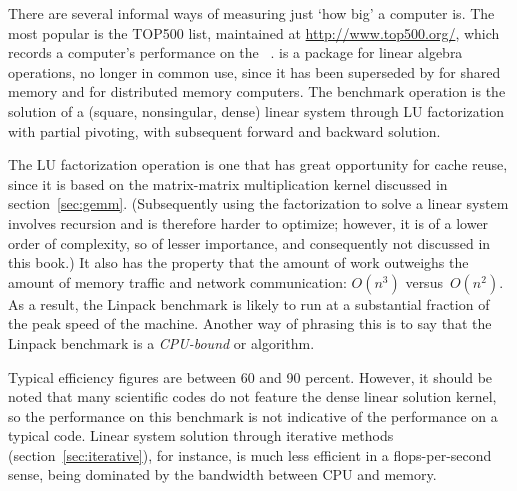 

There are several informal ways of measuring just `how big' a computer
is.
The most popular is the TOP500 list, maintained at
\url{http://www.top500.org/}, which records a computer's performance
on the 
~\cite{Dongarra1987LinpackBenchmark}.
%
 is a
package for linear algebra operations, no longer in common use, since it
has been superseded by  for shared memory and
 for distributed memory computers. The benchmark
operation is the solution of a (square, nonsingular, dense) linear
system through LU factorization with partial pivoting, with subsequent
forward and backward solution.

The LU factorization operation is one that has great opportunity for
cache reuse, since it is based on the matrix-matrix multiplication
kernel discussed in section~\ref{sec:gemm}.
(Subsequently using the factorization to solve a linear system
involves recursion and is therefore harder to optimize;
however, it is of a lower order of complexity, so of lesser importance,
and consequently not discussed in this book.)
It also has the property
that the amount of work outweighs the amount of
memory traffic and network communication:
$O(n^3)$ versus~$O(n^2)$.  As a result, the Linpack benchmark is
likely to run at a substantial fraction of the peak speed of the
machine. Another way of phrasing this is to say that the Linpack
benchmark is a \emph{CPU-bound} or 
algorithm.

Typical efficiency figures are between 60 and 90 percent. However, it
should be noted that many scientific codes do not feature the dense
linear solution kernel, so the performance on this benchmark is not
indicative of the performance on a typical code. Linear system
solution through iterative 
  methods (section~\ref{sec:iterative}),
for instance, is much less efficient in a flops-per-second sense, being
dominated by the bandwidth between CPU and memory.

